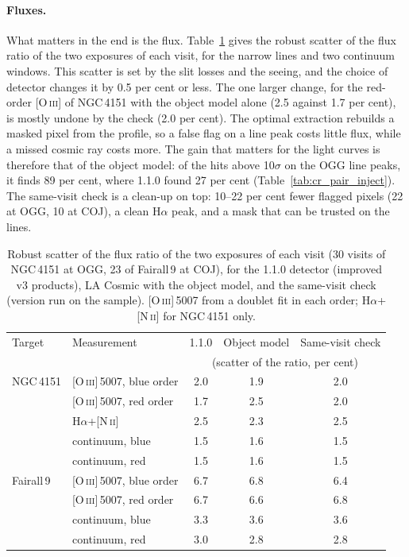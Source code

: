 \paragraph{Fluxes.} What matters in the end is the flux. Table~\ref{tab:cr_pair_flux} gives the robust scatter of the
flux ratio of the two exposures of each visit, for the narrow lines and two continuum windows. This scatter is set by
the slit losses and the seeing, and the choice of detector changes it by 0.5 per cent or less. The one larger change,
for the red-order [O\,\textsc{iii}] of NGC\,4151 with the object model alone (2.5 against 1.7 per cent), is mostly
undone by the check (2.0 per cent). The optimal extraction rebuilds a masked pixel from the profile, so a false flag on
a line peak costs little flux, while a missed cosmic ray costs more. The gain that matters for the light curves is
therefore that of the object model: of the hits above 10$\sigma$ on the OGG line peaks, it finds 89 per cent, where
1.1.0 found 27 per cent (Table~\ref{tab:cr_pair_inject}). The same-visit check is a clean-up on top: 10--22 per cent
fewer flagged pixels (22 at OGG, 10 at COJ), a clean H$\alpha$ peak, and a mask that can be trusted on the lines.

\begin{table}[!htbp]
\centering\small
\caption{Robust scatter of the flux ratio of the two exposures of each visit (30 visits of NGC\,4151 at OGG, 23 of
Fairall\,9 at COJ), for the 1.1.0 detector (improved v3 products), LA Cosmic with the object model, and the same-visit check
(version run on the sample). [O\,\textsc{iii}]\,5007 from a doublet fit in each order; H$\alpha$+[N\,\textsc{ii}] for
NGC\,4151 only.}
\label{tab:cr_pair_flux}
\begin{tabular}{llccc}
\toprule
Target & Measurement & 1.1.0 & Object model & Same-visit check \\
 & & \multicolumn{3}{c}{(scatter of the ratio, per cent)} \\
\midrule
NGC\,4151 & [O\,\textsc{iii}]\,5007, blue order & 2.0 & 1.9 & 2.0 \\
 & [O\,\textsc{iii}]\,5007, red order & 1.7 & 2.5 & 2.0 \\
 & H$\alpha$+[N\,\textsc{ii}] & 2.5 & 2.3 & 2.5 \\
 & continuum, blue & 1.5 & 1.6 & 1.5 \\
 & continuum, red & 1.5 & 1.6 & 1.5 \\
\midrule
Fairall\,9 & [O\,\textsc{iii}]\,5007, blue order & 6.7 & 6.8 & 6.4 \\
 & [O\,\textsc{iii}]\,5007, red order & 6.7 & 6.6 & 6.8 \\
 & continuum, blue & 3.3 & 3.6 & 3.6 \\
 & continuum, red & 3.0 & 2.8 & 2.8 \\
\bottomrule
\end{tabular}
\end{table}
